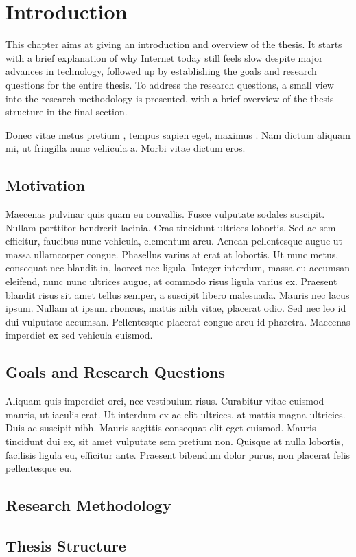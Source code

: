 \chapter{Introduction}

This chapter aims at giving an introduction and overview of the thesis. It starts with a brief explanation of why Internet today still feels slow despite major advances in technology, followed up by establishing the goals and research questions for the entire thesis. To address the research questions, a small view into the research methodology is presented, with a brief overview of the thesis structure in the final section.

Donec vitae metus pretium \cite{latexcompanion}, tempus sapien eget, maximus \cite{knuthwebsite}. Nam dictum aliquam mi, ut fringilla nunc vehicula a. Morbi vitae dictum eros.

\section{Motivation}

Maecenas pulvinar quis quam eu convallis. Fusce vulputate sodales suscipit. Nullam porttitor hendrerit lacinia. Cras tincidunt ultrices lobortis. Sed ac sem efficitur, faucibus nunc vehicula, elementum arcu. Aenean pellentesque augue ut massa ullamcorper congue. Phasellus varius at erat at lobortis. Ut nunc metus, consequat nec blandit in, laoreet nec ligula. Integer interdum, massa eu accumsan eleifend, nunc nunc ultrices augue, at commodo risus ligula varius ex. Praesent blandit risus sit amet tellus semper, a suscipit libero malesuada. Mauris nec lacus ipsum. Nullam at ipsum rhoncus, mattis nibh vitae, placerat odio. Sed nec leo id dui vulputate accumsan. Pellentesque placerat congue arcu id pharetra. Maecenas imperdiet ex sed vehicula euismod.

\section{Goals and Research Questions}

Aliquam quis imperdiet orci, nec vestibulum risus. Curabitur vitae euismod mauris, ut iaculis erat. Ut interdum ex ac elit ultrices, at mattis magna ultricies. Duis ac suscipit nibh. Mauris sagittis consequat elit eget euismod. Mauris tincidunt dui ex, sit amet vulputate sem pretium non. Quisque at nulla lobortis, facilisis ligula eu, efficitur ante. Praesent bibendum dolor purus, non placerat felis pellentesque eu.

\section{Research Methodology}

\section{Thesis Structure}